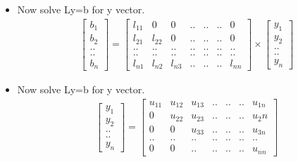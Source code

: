 \documentclass[12pt]{beamer}
\begin{document}
\begin{frame}
\begin{center}
\begin{itemize}
\item Now solve Ly=b for y vector.\\
\begin{equation*}
\begin{matrix}
	\begin{bmatrix}
	b_1\\ b_2\\ ..\\ ..\\ b_n
	\end{bmatrix}
=  
	\begin{bmatrix}
	l_{11} & 0 & 0 & .. & .. & .. & 0\\
	l_{21} & l_{22} & 0 & ..& ..& .. & 0\\
	.. & .. & .. & .. & .. & .. & ..\\
	.. & .. & .. & .. & .. & .. & ..\\
	l_{n1} & l_{n2} & l_{n3} & .. & .. & .. & l_{nn}
	
	\end{bmatrix}
	  \times
	  \begin{bmatrix}
	 	y_1\\ y_2\\ ..\\ ..\\ y_n
	 	\end{bmatrix}
\end{matrix}
\end{equation*}
\end{itemize}
\end{center}
\begin{center}
\begin{itemize}
\item Now solve Ly=b for y vector.\\
\begin{equation*}
\begin{matrix}
	
	\begin{bmatrix}
	y_1\\ y_2\\ ..\\ ..\\ y_n
	\end{bmatrix}
=  
	\begin{bmatrix}
	u_{11} & u_{12} & u_{13} & .. & .. & .. & u_{1n}\\
	0 & u_{22} & u_{23} & ..& ..& .. & u_2n\\
	0 & 0 & u_{33} & .. & ..& .. & u_{3n}\\
	.. & .. & .. & .. & .. & .. & ..\\
	0 & 0 & .. & .. & .. & ..& u_{nn}
	

\end{bmatrix}
\end{matrix}
\end{equation*}
\end{itemize}
\end{center}
\end{frame}
\end{document}
